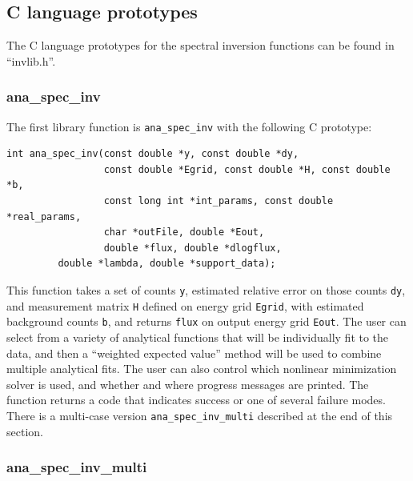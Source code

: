 \documentclass{article}    %
\begin{document}
\subsection{C language prototypes}

The C language prototypes for the spectral inversion functions can be
found in ``invlib.h''.

\subsubsection{ana\_spec\_inv}

The first library function is \verb|ana_spec_inv| with the following C prototype:
\begin{verbatim}
int ana_spec_inv(const double *y, const double *dy, 
                 const double *Egrid, const double *H, const double *b,
                 const long int *int_params, const double *real_params,
                 char *outFile, double *Eout, 
                 double *flux, double *dlogflux, 
		 double *lambda, double *support_data);
\end{verbatim}
                  
This function takes a set of counts \verb|y|, estimated relative error
on those counts \verb|dy|, and measurement matrix \verb|H| defined on
energy grid \verb|Egrid|, with estimated background counts \verb|b|,
and returns \verb|flux| on output energy grid \verb|Eout|. The user
can select from a variety of analytical functions that will be
individually fit to the data, and then a ``weighted expected value''
method will be used to combine multiple analytical fits. The user can
also control which nonlinear minimization solver is used, and whether
and where progress messages are printed. The function returns a code
that indicates success or one of several failure modes. There is a
multi-case version \verb|ana_spec_inv_multi| described at the end of
this section.

\subsubsection{ana\_spec\_inv\_multi}
\end{document}
